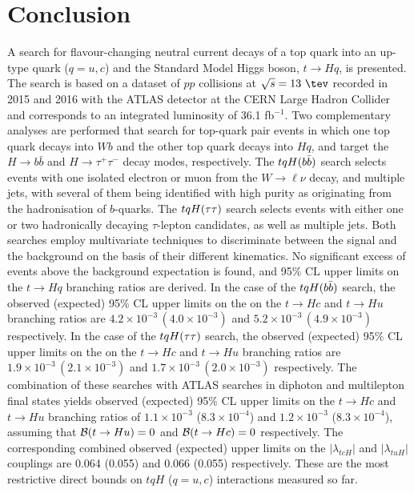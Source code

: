 \section{Conclusion}
\label{sec:conclusion}

A search for flavour-changing neutral current decays of a top quark into an up-type quark ($q=u, c$) and the Standard Model Higgs boson, $t\to Hq$, is presented. 
The search is based on a dataset of $pp$ collisions at $\sqrt{s}=13~\tev$ recorded in 2015 and 2016 with the ATLAS detector at the 
CERN Large Hadron Collider and corresponds to an integrated luminosity of 36.1 fb$^{-1}$.
Two complementary analyses are performed that search for top-quark pair events in which one top quark decays into $Wb$ and the other top quark decays into $Hq$,
and target the $H \to b\bar{b}$ and $H \to \tau^+\tau^-$  decay modes, respectively.  
The $tqH(b\bar{b})$ search selects events with one isolated electron or muon from the $W \to \ell\nu$ decay, and multiple jets, with several 
of them being identified with high purity as originating from the hadronisation of $b$-quarks. 
The $tqH(\tau\tau)$ search selects events with either one or two hadronically decaying $\tau$-lepton candidates, as well as multiple jets. 
Both searches employ multivariate techniques to discriminate between the signal and the background on the basis of their different kinematics. 
No significant excess of events above the background expectation is found, and 95\% CL upper limits on the $t\to Hq$ branching ratios are derived.
In the case of the $tqH(b\bar{b})$ search, the observed (expected) 95\% CL upper limits on the on the $t\to Hc$ and $t\to Hu$ branching ratios 
are $4.2 \times 10^{-3}\,(4.0 \times 10^{-3})$ and $5.2 \times 10^{-3}\,(4.9 \times 10^{-3})$ respectively.
In the case of the $tqH(\tau\tau)$ search, the observed (expected) 95\% CL upper limits on the on the $t\to Hc$ and $t\to Hu$ branching ratios 
are $1.9 \times 10^{-3}\,(2.1 \times 10^{-3})$ and $1.7 \times 10^{-3}\,(2.0 \times 10^{-3})$ respectively.
The combination of these searches with ATLAS searches in diphoton and multilepton final states 
yields observed (expected) 95\% CL upper limits on the $t\to Hc$ and $t\to Hu$ branching ratios of $1.1 \times 10^{-3}$ ($8.3 \times 10^{-4}$) 
and $1.2 \times 10^{-3}$ ($8.3 \times 10^{-4}$), assuming that $\mathcal{B}(t\to Hu)=0$ and $\mathcal{B}(t\to Hc)=0$ respectively.
The corresponding combined observed (expected) upper limits on the $|\lambda_{tcH}|$ and $|\lambda_{tuH}|$ couplings are 0.064 (0.055) and 0.066 (0.055) respectively. 
These are the most restrictive direct bounds on $tqH$ ($q=u,c$) interactions measured so far.
